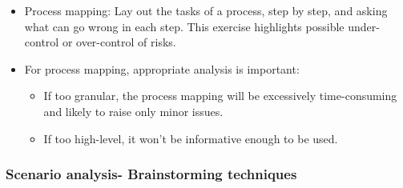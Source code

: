 \begin{itemize}
\begin{itemize}
        \begin{itemize}
        \item If too granular, the output will be a collection of small daily risks and inefficiencies that are not always of much value. People may miss the big picture when it comes to risks.
        \end{itemize}
    \end{itemize}
\item Process mapping: Lay out the tasks of a process, step by step, and asking what can go wrong in each step. This exercise highlights possible under-control or over-control of risks.
\item For process mapping, appropriate analysis is important:
    \begin{itemize}
    \item If too granular, the process mapping will be excessively time-consuming and likely to raise only minor issues.
    \item  If too high-level, it won't be informative enough to be used.
    \end{itemize}
\end{itemize}




\subsubsection{Scenario analysis- Brainstorming techniques}


